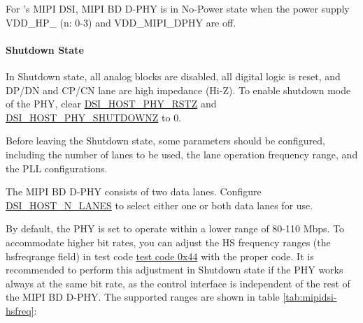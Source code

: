 \documentclass[main\_\_EN.tex]{subfiles}
\begin{document}
For \chipname{}'s MIPI DSI, MIPI BD D-PHY is in No-Power state when the power supply VDD\_HP\_ (n: 0-3) and VDD\_MIPI\_DPHY are off.

\paragraph{Shutdown State}
In Shutdown state, all analog blocks are disabled, all digital logic is reset, and DP/DN and CP/CN lane are high impedance (Hi-Z). To enable shutdown mode of the PHY, clear \hyperref[fielddesc:DSIHOSTPHYRSTZ]{DSI\_HOST\_PHY\_RSTZ} and \hyperref[fielddesc:DSIHOSTPHYSHUTDOWNZ]{DSI\_HOST\_PHY\_SHUTDOWNZ} to 0.

Before leaving the Shutdown state, some parameters should be configured, including the number of lanes to be used, the lane operation frequency range, and the PLL configurations.

The MIPI BD D-PHY consists of two data lanes. Configure \hyperref[fielddesc:DSIHOSTNLANES]{DSI\_HOST\_N\_LANES} to select either one or both data lanes for use.

By default, the PHY is set to operate within a lower range of 80-110 Mbps. To accommodate higher bit rates, you can adjust the HS frequency ranges (the hsfreqrange field) in test code \hyperref[sec:test-code-0x44]{test code 0x44} with the proper code. It is recommended to perform this adjustment in Shutdown state if the PHY works always at the same bit rate, as the control interface is independent of the rest of the MIPI BD D-PHY. The supported ranges are shown in table \ref{tab:mipidsi-hsfreq}:
\end{document}
